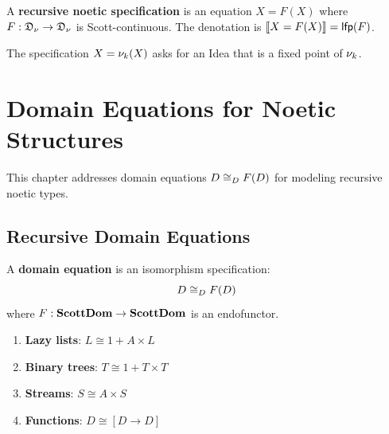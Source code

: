 \begin{definition}
\label{def:recursive-spec}
A \textbf{recursive noetic specification} is an equation $X = F(X)$ where
$F : \mathfrak{D}_\nu \to \mathfrak{D}_\nu$ is Scott-continuous.
The denotation is $\llbracket X = F(X) \rrbracket = \mathsf{lfp}(F)$.
\end{definition}

\begin{example}
\label{ex:infinite-fractal}
The specification $X = \nu_{k}(X)$ asks for an Idea that is a fixed point of $\nu_{k}$.
\end{example}


\chapter{Domain Equations for Noetic Structures}
\label{ch:domain-equations}

\begin{tcolorbox}[colback=blue!5!white,colframe=blue!75!black,title=\vnewfour]
This chapter addresses domain equations $D \cong_D F(D)$ for modeling
recursive noetic types.
\end{tcolorbox}

\section{Recursive Domain Equations}

\begin{definition}
\label{def:domain-equation}
A \textbf{domain equation} is an isomorphism specification:
\[
D \cong_D F(D)
\]
where $F : \mathbf{ScottDom} \to \mathbf{ScottDom}$ is an endofunctor.
\end{definition}

\begin{example}
\label{ex:canonical-domain-eq}
\begin{enumerate}[label=(\alph*)]
  \item \textbf{Lazy lists}: $L \cong 1 + A \times L$
  \item \textbf{Binary trees}: $T \cong 1 + T \times T$
  \item \textbf{Streams}: $S \cong A \times S$
  \item \textbf{Functions}: $D \cong [D \to D]$
\end{enumerate}
\end{example}

